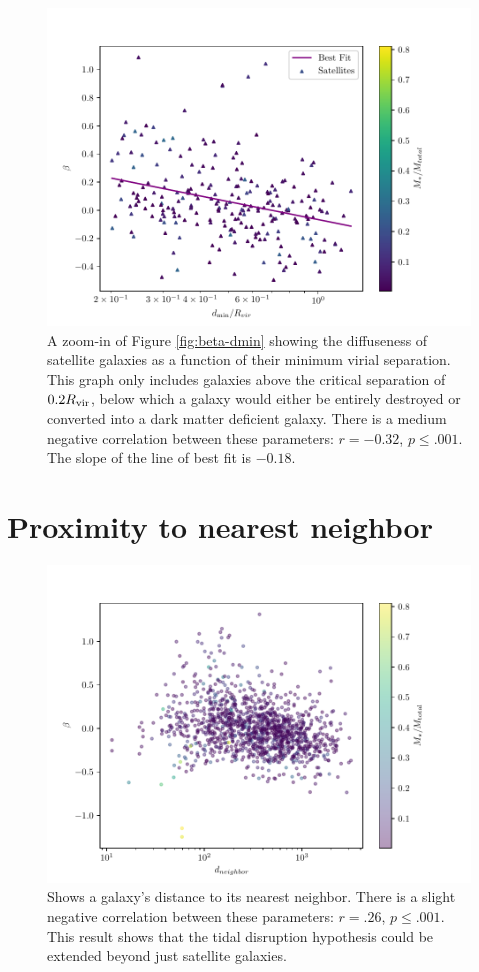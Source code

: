 \begin{figure}
    \centering
    \includegraphics*[width=\textwidth*2/3]{figs/me/beta-dmin-fit.pdf}
    \caption{A zoom-in of Figure \ref{fig:beta-dmin} showing the diffuseness of satellite galaxies as a function of their minimum virial separation. This graph only includes galaxies above the critical separation of $0.2 R_{\rm{vir}}$, below which a galaxy would either be entirely destroyed or converted into a dark matter deficient galaxy. There is a medium negative correlation between these parameters: $r=-0.32$, $p \leq .001$. The slope of the line of best fit is $-0.18$.}
    \label{fig:beta-dmin-fit}
\end{figure}


\section{Proximity to nearest neighbor}

\begin{figure}
    \centering
    \includegraphics*[width=\textwidth*2/3]{figs/me/beta-d_nearest.pdf}
    \caption{Shows a galaxy's distance to its nearest neighbor. There is a slight negative correlation between these parameters: $r = .26$, $p \leq .001$. This result shows that the tidal disruption hypothesis could be extended beyond just satellite galaxies.}

\end{figure}

